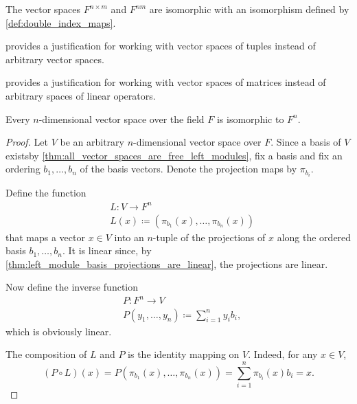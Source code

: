 \begin{proposition}\label{def:matrix_spaces_are_tuple_spaces}
  The vector spaces \( F^{n \times m} \) and \( F^{nm} \) are isomorphic with an isomorphism defined by \cref{def:double_index_maps}.
\end{proposition}

\begin{remark}\label{remark:vector_spaces_of_tuples_and_matrices}
   provides a justification for working with vector spaces of tuples instead of arbitrary vector spaces.

   provides a justification for working with vector spaces of matrices instead of arbitrary spaces of linear operators.
\end{remark}

\begin{theorem}\label{thm:finite_dimensional_spaces_are_isomorphic}
  Every \( n \)-dimensional vector space over the field \( F \) is isomorphic to \( F^n \).
\end{theorem}
\begin{proof}
  Let \( V \) be an arbitrary \( n \)-dimensional vector space over \( F \). Since a basis of \( V \) exists\AOC by \cref{thm:all_vector_spaces_are_free_left_modules}, fix a basis and fix an ordering \( b_1, \ldots, b_n \) of the basis vectors. Denote the projection maps by \( \pi_{b_i} \).

  Define the function
  \begin{align*}
    &L: V \to F^n \\
    &L(x) \coloneqq (\pi_{b_1}(x), \ldots, \pi_{b_n}(x))
  \end{align*}
  that maps a vector \( x \in V \) into an \( n \)-tuple of the projections of \( x \) along the ordered basis \( b_1, \ldots, b_n \). It is linear since, by \cref{thm:left_module_basis_projections_are_linear}, the projections are linear.

  Now define the inverse function
  \begin{align*}
    &P: F^n \to V \\
    &P(y_1, \ldots, y_n) \coloneqq \sum_{i=1}^n y_i b_i,
  \end{align*}
  which is obviously linear.

  The composition of \( L \) and \( P \) is the identity mapping on \( V \). Indeed, for any \( x \in V \),
  \begin{equation*}
    (P \circ L)(x)
    =
    P(\pi_{b_1}(x), \ldots, \pi_{b_n}(x))
    =
    \sum_{i=1}^n \pi_{b_i}(x) b_i
    =
    x.
  \end{equation*}
\end{proof}

